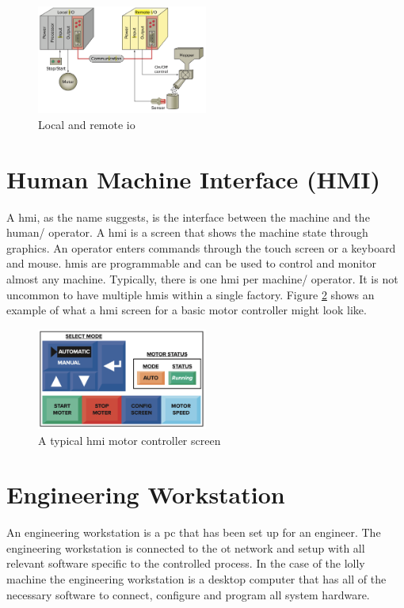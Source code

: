     \begin{figure}[H]
        \centering
        \includegraphics[width = 0.5\textwidth]{2_images/localRemoteIo.png}
        \caption{Local and remote \acrshort{io}}
        \label{fig:localRemoteIo}
    \end{figure}
 
\section{Human Machine Interface (HMI)}
    A \acrfull{hmi}, as the name suggests, is the interface between the machine and the human/ operator. A \acrshort{hmi} is a screen that shows the machine state through graphics. An operator enters commands through the touch screen or a keyboard and mouse. \acrshort{hmi}s are programmable and can be used to control and monitor almost any machine\cite{petruzella2017programmable}. Typically, there is one \acrshort{hmi} per machine/ operator. It is not uncommon to have multiple \acrshort{hmi}s within a single factory. Figure \ref{fig:typHmi} shows an example of what a \acrshort{hmi} screen for a basic motor controller might look like.

    \begin{figure}[H]
        \centering
        \includegraphics[width = 0.5\textwidth]{2_images/typicalHmi.png}
        \caption{A typical \acrshort{hmi} motor controller screen\cite{petruzella2017programmable}}
        \label{fig:typHmi}
    \end{figure}    
    
\section{Engineering Workstation}
    An engineering workstation is a \acrshort{pc} that has been set up for an engineer. The engineering workstation is connected to the \acrshort{ot} network and setup with all relevant software specific to the controlled process. In the case of the lolly machine the engineering workstation is a desktop computer that has all of the necessary  software to connect, configure and program all system hardware. 

